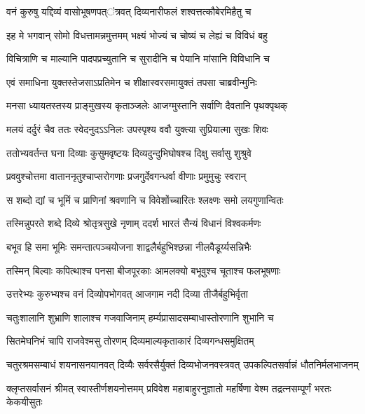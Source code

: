\twolineshloka
{वनं कुरुषु यद्दिव्यं वासोभूषणपत्ऺत्रवत्}
{दिव्यनारीफलं शश्वत्तत्कौबेरमिहैतु च} %

\twolineshloka
{इह मे भगवान् सोमो विधत्तामन्नमुत्तमम्}
{भक्ष्यं भोज्यं च चोष्यं च लेह्यं च विविधं बहु} %

\twolineshloka
{विचित्राणि च माल्यानि पादपप्रच्युतानि च}
{सुरादीनि च पेयानि मांसानि विविधानि च} %

\twolineshloka
{एवं समाधिना युक्तस्तेजसाऽप्रतिमेन च}
{शीक्षास्वरसमायुक्तं तपसा चाब्रवीन्मुनिः} %

\twolineshloka
{मनसा ध्यायतस्तस्य प्राङ्मुखस्य कृताञ्जलेः}
{आजग्मुस्तानि सर्वाणि दैवतानि पृथक्पृथक्} %

\twolineshloka
{मलयं दर्दुरं चैव ततः स्वेदनुदऽऽनिलः}
{उपस्पृश्य ववौ युक्त्या सुप्रियात्मा सुखः शिवः} %

\twolineshloka
{ततोभ्यवर्तन्त घना दिव्याः कुसुमवृष्टयः}
{दिव्यदुन्दुभिघोषश्च दिक्षु सर्वासु शुश्रुवे} %

\twolineshloka
{प्रववुश्चोत्तमा वाताननृतुश्चाप्सरोगणाः}
{प्रजगुर्देवगन्धर्वा वीणाः प्रमुमुचुः स्वरान्} %

\twolineshloka
{स शब्दो द्यां च भूमिं च प्राणिनां श्रवणानि च}
{विवेशोऺच्चारितः श्लक्ष्णः समो लयगुणान्वितः} %

\twolineshloka
{तस्मिन्नुपरते शब्दे दिव्ये श्रोतृत्रसुखे नृणाम्}
{ददर्श भारतं सैन्यं विधानं विश्वकर्मणः} %

\twolineshloka
{बभूव हि समा भूमिः समन्तात्पञ्चयोजना}
{शाद्वलैर्बहुभिश्छन्ना नीलवैडूर्य्यसन्निभैः} %

\twolineshloka
{तस्मिन् बिल्वाः कपित्थाश्च पनसा बीजपूरकाः}
{आमलक्यो बभूवुश्च चूताश्च फलभूषणाः} %

\twolineshloka
{उत्तरेभ्यः कुरुभ्यश्च वनं दिव्योपभोगवत्}
{आजगाम नदी दिव्या तीजैर्बहुभिर्वृता} %

\twolineshloka
{चतुःशालानि शुभ्राणि शालाश्च गजवाजिनाम्}
{हर्म्यप्रासादसम्बाधास्तोरणानि शुभानि च} %

\twolineshloka
{सितमेघनिभं चापि राजवेश्मसु तोरणम्}
{दिव्यमाल्यकृताकारं दिव्यगन्धसमुक्षितम्} %

\threelineshloka
{चतुरश्रमसम्बाधं शयनासनयानवत्}
{दिव्यैः सर्वरसैर्युक्तं दिव्यभोजनवस्त्रवत्}
{उपकल्पितसर्वान्नं धौतनिर्मलभाजनम्} %

\threelineshloka
{क्लृप्तसर्वासनं श्रीमत् स्वास्तीर्णशयनोत्तमम्}
{प्रविवेश महाबाहुरनुज्ञातो महर्षिणा}
{वेश्म तद्रत्नसम्पूर्णं भरतः केकयीसुतः} %

